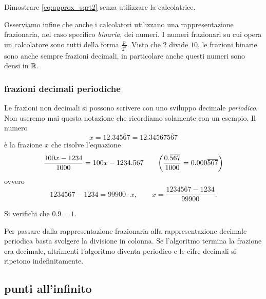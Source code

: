 \begin{exercise}
Dimostrare \ref{eq:approx_sqrt2} senza 
utilizzare la calcolatrice.
\end{exercise}

Osserviamo infine che anche i calcolatori utilizzano una rappresentazione frazionaria, 
nel caso specifico \emph{binaria}, dei numeri.
I numeri frazionari su cui opera un calcolatore sono tutti della forma $\frac{p}{2^d}$.
Visto che $2$ divide $10$, le frazioni binarie sono anche sempre frazioni decimali, 
in particolare anche questi numeri sono densi in ${\mathbb R}$.

\subsubsection{frazioni decimali periodiche}

Le frazioni non decimali si possono scrivere con uno sviluppo
decimale \emph{periodico}. 
Non useremo mai questa notazione
che ricordiamo solamente con un esempio.
Il numero
\[
  x = 12.34\overline{567}
    = 12.34567\overline{567}
\]
è la frazione $x$ che risolve l'equazione
\[
  \frac{100x - 1234}{1000}
  = 100x-1234.567
  \qquad
{\left( \frac{0.\overline{567}}{1000}
= 0.000\overline{567}  \right)}
\]
ovvero
\[
  1234567 - 1234 = 99900 \cdot x,
  \qquad x = \frac{1234567-1234}{99900}.
\]

\begin{exercise}
Si verifichi che $0.\overline 9 = 1$.
\end{exercise}
    
Per passare dalla rappresentazione frazionaria alla rappresentazione 
decimale periodica basta svolgere la divisione in colonna.
Se l'algoritmo termina la frazione era decimale, altrimenti l'algoritmo 
diventa periodico e le cifre decimali si ripetono indefinitamente.


\subsection{punti all'infinito}
\label{sec:reali_estesi}

